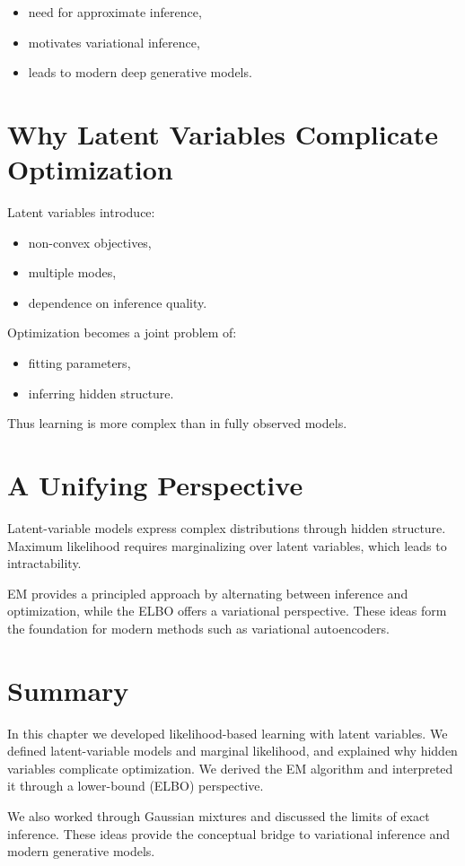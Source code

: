 \begin{itemize}
    \item need for approximate inference,
    \item motivates variational inference,
    \item leads to modern deep generative models.
\end{itemize}

\section{Why Latent Variables Complicate Optimization}

Latent variables introduce:
\begin{itemize}
    \item non-convex objectives,
    \item multiple modes,
    \item dependence on inference quality.
\end{itemize}

Optimization becomes a joint problem of:
\begin{itemize}
    \item fitting parameters,
    \item inferring hidden structure.
\end{itemize}

Thus learning is more complex than in fully observed models.

\section{A Unifying Perspective}

Latent-variable models express complex distributions through hidden structure. Maximum likelihood requires marginalizing over latent variables, which leads to intractability.

EM provides a principled approach by alternating between inference and optimization, while the ELBO offers a variational perspective. These ideas form the foundation for modern methods such as variational autoencoders.

\section{Summary}

In this chapter we developed likelihood-based learning with latent variables. We defined latent-variable models and marginal likelihood, and explained why hidden variables complicate optimization. We derived the EM algorithm and interpreted it through a lower-bound (ELBO) perspective.

We also worked through Gaussian mixtures and discussed the limits of exact inference. These ideas provide the conceptual bridge to variational inference and modern generative models.
